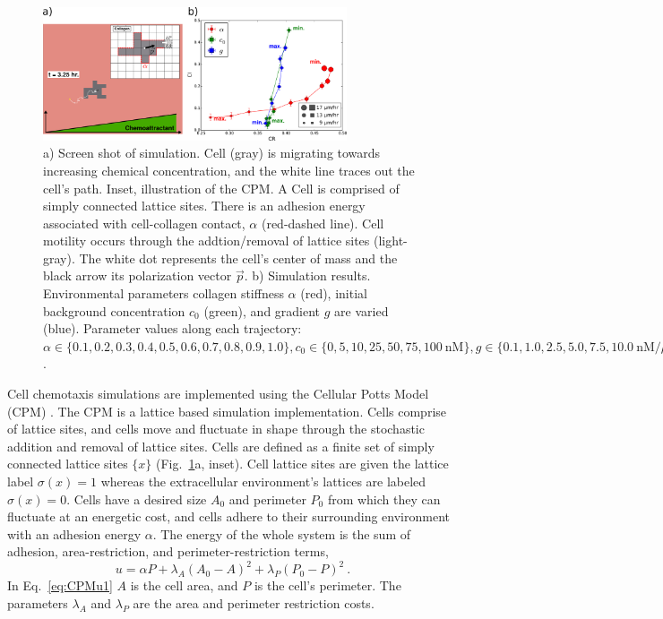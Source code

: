 \begin{figure}
    \centering
    \includegraphics[width=0.80\textwidth]{../fig/ch2_fig3.png}
    \caption{a) Screen shot of simulation. Cell (gray) is migrating towards increasing chemical concentration, and the white line traces out the cell's path. Inset, illustration of the CPM. A Cell is comprised of simply connected lattice sites. There is an adhesion energy associated with cell-collagen contact, $\alpha$ (red-dashed line). Cell motility occurs through the addtion/removal of lattice sites (light-gray). The white dot represents the cell's center of mass and the black arrow its polarization vector $\vec{p}$. b) Simulation results. Environmental parameters collagen stiffness $\alpha$ (red), initial background concentration $c_0$ (green), and gradient $g$ are varied (blue).
    Parameter values along each trajectory:
    $\alpha \in \{ 0.1, 0.2, 0.3, 0.4, 0.5, 0.6, 0.7, 0.8, 0.9, 1.0 \},
    c_0 \in \{ 0, 5, 10, 25, 50, 75, 100 \ \text{nM} \},
    g \in \{ 0.1, 1.0, 2.5, 5.0, 7.5, 10.0 \ \text{nM}/\mu\text{m} \}$.}
    \label{fig:ch2_3}
\end{figure}

Cell chemotaxis simulations are implemented using the Cellular Potts Model (CPM) \cite{graner1992simulation,swat2012multi}. The CPM is a lattice based simulation implementation. Cells comprise of lattice sites, and cells move and fluctuate in shape through the stochastic addition and removal of lattice sites. Cells are defined as a finite set of simply connected lattice sites
$\{ x \}$ (Fig.\ \ref{fig:ch2_3}a, inset).
Cell lattice sites are given the lattice label $\sigma(x)=1$ whereas the extracellular environment's lattices are labeled $\sigma(x)=0$. Cells have a desired size $A_0$ and perimeter $P_0$ from which they can fluctuate at an energetic cost, and cells adhere to their surrounding environment with an adhesion energy $\alpha$. The energy of the whole system is the sum of adhesion, area-restriction, and perimeter-restriction terms,
\begin{equation} \label{eq:CPMu1}
    u = \alpha P + \lambda_A(A_0 - A)^2 + \lambda_P(P_0 - P)^2 \ .
\end{equation}
In Eq.\ \ref{eq:CPMu1} $A$ is the cell area, and $P$ is the cell's perimeter. The parameters $\lambda_{A}$ and $\lambda_{P}$ are the area and perimeter restriction costs.

